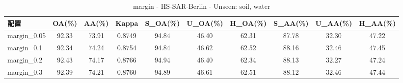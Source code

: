 \begin{table}[htbp]
\centering
\caption{margin - HS-SAR-Berlin - Unseen: soil, water}
\begin{tabular}{lccccccccc}
\hline
配置 & OA(\%) & AA(\%) & Kappa & S\_OA(\%) & U\_OA(\%) & H\_OA(\%) & S\_AA(\%) & U\_AA(\%) & H\_AA(\%) \\
\hline
margin_0.05 & 92.33 & 73.91 & 0.8749 & 94.84 & 46.40 & 62.31 & 87.78 & 32.30 & 47.22 \\
margin_0.1 & 92.34 & 74.24 & 0.8754 & 94.84 & 46.62 & 62.52 & 88.16 & 32.46 & 47.45 \\
margin_0.2 & 92.43 & 74.17 & 0.8766 & 94.94 & 46.40 & 62.34 & 88.13 & 32.27 & 47.24 \\
margin_0.3 & 92.39 & 74.21 & 0.8760 & 94.89 & 46.61 & 62.51 & 88.12 & 32.46 & 47.44 \\
\hline
\end{tabular}
\end{table}